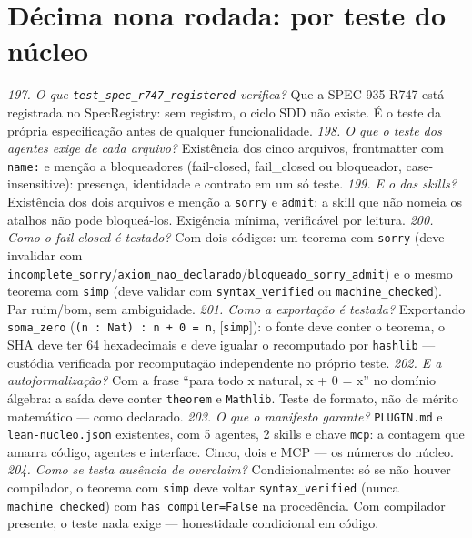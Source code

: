 \section{Décima nona rodada: por teste do núcleo}
\textit{197. O que \texttt{test\_spec\_r747\_registered} verifica?} Que a SPEC-935-R747 está registrada no SpecRegistry: sem registro, o ciclo SDD não existe. É o teste da própria especificação antes de qualquer funcionalidade.
\textit{198. O que o teste dos agentes exige de cada arquivo?} Existência dos cinco arquivos, frontmatter com \texttt{name:} e menção a bloqueadores (fail-closed, fail\_closed ou bloqueador, case-insensitive): presença, identidade e contrato em um só teste.
\textit{199. E o das skills?} Existência dos dois arquivos e menção a \texttt{sorry} e \texttt{admit}: a skill que não nomeia os atalhos não pode bloqueá-los. Exigência mínima, verificável por leitura.
\textit{200. Como o fail-closed é testado?} Com dois códigos: um teorema com \texttt{sorry} (deve invalidar com \texttt{incomplete\_sorry}/\texttt{axiom\_nao\_declarado}/\texttt{bloqueado\_sorry\_admit}) e o mesmo teorema com \texttt{simp} (deve validar com \texttt{syntax\_verified} ou \texttt{machine\_checked}). Par ruim/bom, sem ambiguidade.
\textit{201. Como a exportação é testada?} Exportando \texttt{soma\_zero} (\texttt{(n : Nat) : n + 0 = n}, [\texttt{simp}]): o fonte deve conter o teorema, o SHA deve ter 64 hexadecimais e deve igualar o recomputado por \texttt{hashlib} --- custódia verificada por recomputação independente no próprio teste.
\textit{202. E a autoformalização?} Com a frase ``para todo x natural, x + 0 = x'' no domínio álgebra: a saída deve conter \texttt{theorem} e \texttt{Mathlib}. Teste de formato, não de mérito matemático --- como declarado.
\textit{203. O que o manifesto garante?} \texttt{PLUGIN.md} e \texttt{lean-nucleo.json} existentes, com 5 agentes, 2 skills e chave \texttt{mcp}: a contagem que amarra código, agentes e interface. Cinco, dois e MCP --- os números do núcleo.
\textit{204. Como se testa ausência de overclaim?} Condicionalmente: só se não houver compilador, o teorema com \texttt{simp} deve voltar \texttt{syntax\_verified} (nunca \texttt{machine\_checked}) com \texttt{has\_compiler=False} na procedência. Com compilador presente, o teste nada exige --- honestidade condicional em código.
